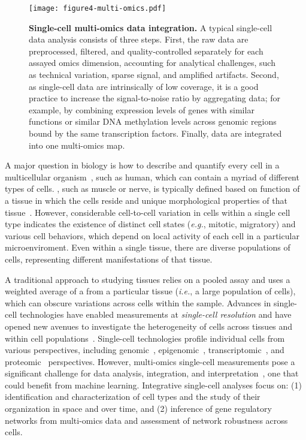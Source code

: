 \documentclass[5p]{elsarticle}
\newcommand{\eg}{\emph{e.g.}\xspace}
\newcommand{\ie}{\emph{i.e.}\xspace}
\newcommand{\rev}[1]{{\color{black}#1}}
\begin{document}
\begin{figure}[t]
\centering
\texttt{[image: figure4-multi-omics.pdf]}
\caption{\textbf{\rev{Single-cell multi-omics data integration.}} \rev{A typical single-cell data analysis consists of} three steps. First, the raw data are preprocessed, filtered, and quality-controlled separately for each assayed omics dimension, accounting for \rev{analytical challenges}, such as technical variation, sparse signal, and amplified artifacts. Second, as single-cell data are intrinsically of low coverage, it is a good practice to increase the \rev{signal-to-noise} ratio by aggregating data; for example, by combining expression levels of genes \rev{with similar functions} or similar DNA methylation levels across genomic regions bound by the same transcription factors. Finally, data are integrated into one multi-omics \rev{map.}}
\label{fig:multiomics}
\end{figure}

A major question in biology is how to describe and quantify every cell in a multicellular organism~\cite{regev2017science}, such as human, \rev{which can contain} a myriad of different types of cells.
\rev{{\em Cell type}, such as muscle or nerve, is typically defined based on function of a tissue in which the cells reside and unique morphological properties of that tissue}~\cite{Clevers2017your}.
However, considerable cell-to-cell variation in cells within a single cell type \rev{indicates the existence of distinct} cell states (\eg, mitotic, \rev{migratory}) and various cell \rev{behaviors, which depend} on local activity of each cell in a particular microenviroment.
Even within a single tissue, there are diverse populations of cells, representing different manifestations of that tissue.

A traditional approach to studying tissues \rev{relies} on a pooled assay and \rev{uses} a weighted average of a \rev{{\em bulk sample of cells}} from a particular tissue (\ie, a large population of cells), \rev{which can obscure variations across cells within the sample}.
Advances in single-cell technologies have enabled measurements at {\em single-cell resolution} and have opened new avenues to investigate the heterogeneity of cells across tissues and within cell populations~\cite{kelsey2017single}.
Single-cell technologies \rev{profile} individual cells from various perspectives, including genomic~\cite{gawad2016single}, epigeno\-mic~\cite{schwartzman2015single}, transcriptomic~\cite{stegle2015computational}, and proteomic~\cite{wu2012single} \rev{perspectives}.
However, multi-omics single-cell measurements pose a significant challenge for data analysis, integration, and interpretation~\cite{yuan2017challenges}, one that could benefit from machine learning.
Integrative single-cell analyses focus on: (1) identification and characterization of cell types and the study of their organization in space and over time, and (2) inference of gene regulatory networks from multi-omics data and assessment of network robustness across cells.
\end{document}

